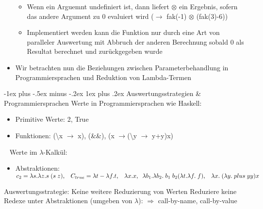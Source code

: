 \documentclass[10pt]{article}
\makeatletter
\renewcommand{\subsubsection}{\@startsection{subsubsection}{3}{0mm}%
                                {-1ex plus -.5ex minus -.2ex}%
                                {1ex plus .2ex}%
                                {\normalfont\small\bfseries}}
\makeatother
\begin{document}
\begin{itemize}
\begin{itemize}
          \item Wenn ein Arguemnt undefiniert ist, dann liefert $\otimes$ ein Ergebnis, sofern das andere Argument zu 0 evaluiert wird ($\rightarrow$ fak(-1) $\otimes$ (fak(3)-6))
          \item Implementiert werden kann die Funktion nur durch eine Art von paralleler Auswertung mit Abbruch der anderen Berechnung sobald 0 als Resultat berechnet und zurückgegeben wurde
        \end{itemize}
  \item Wir betrachten nun die Beziehungen zwischen Parameterbehandlung in Programmiersprachen und Reduktion von Lambda-Termen
\end{itemize}
\subsubsection{Auswertungsstrategien \& Programmiersprachen}
\color{blue} Werte in Programmiersprachen wie Haskell: \color{black}
\begin{itemize}
  \item Primitive Werte: 2, True
  \item Funktionen: (\textbackslash x $\rightarrow$ x), (\&\&), (x $\rightarrow$(\textbackslash y $\rightarrow$ y+y)x)
\end{itemize}
\ \newline 
\color{blue} Werte im $\lambda$-Kalkül:
\color{black} \begin{itemize}
  \item Abstraktionen: $c_2 = \lambda s. \lambda z.s\;(s\;z),\;\;\; C_{true} = \lambda t- \lambda f.t,\;\;\; \lambda x.x,\;\;\; \newline \lambda b_1. \lambda b_2.\;b_1\; b_2 (\lambda t.\lambda f.\;f),\;\;\; \lambda x.\;(\lambda y.\;plus\; yy)x$
\end{itemize}
\color{blue} Auswertungsstrategie: \color{black} Keine weitere Reduzierung von Werten \newline
Reduziere keine Redexe unter Abstraktionen (umgeben von $\lambda$):\newline
$\Rightarrow$ call-by-name, call-by-value
\end{document}
